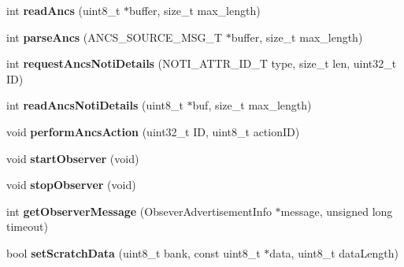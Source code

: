 \begin{DoxyCompactItemize}
\item 
\hypertarget{class_bean_class_af5b1a7b7c109a541f916d4b48a5470af}{}int {\bfseries read\+Ancs} (uint8\+\_\+t $\ast$buffer, size\+\_\+t max\+\_\+length)\label{class_bean_class_af5b1a7b7c109a541f916d4b48a5470af}

\item 
\hypertarget{class_bean_class_a9621a98175bbc20038614a2f302e64bb}{}int {\bfseries parse\+Ancs} (A\+N\+C\+S\+\_\+\+S\+O\+U\+R\+C\+E\+\_\+\+M\+S\+G\+\_\+\+T $\ast$buffer, size\+\_\+t max\+\_\+length)\label{class_bean_class_a9621a98175bbc20038614a2f302e64bb}

\item 
\hypertarget{class_bean_class_aea0173fbc9c1b67be8b945bcf67f5fd8}{}int {\bfseries request\+Ancs\+Noti\+Details} (N\+O\+T\+I\+\_\+\+A\+T\+T\+R\+\_\+\+I\+D\+\_\+\+T type, size\+\_\+t len, uint32\+\_\+t I\+D)\label{class_bean_class_aea0173fbc9c1b67be8b945bcf67f5fd8}

\item 
\hypertarget{class_bean_class_a45afe8462a0b407631befad67f225d2a}{}int {\bfseries read\+Ancs\+Noti\+Details} (uint8\+\_\+t $\ast$buf, size\+\_\+t max\+\_\+length)\label{class_bean_class_a45afe8462a0b407631befad67f225d2a}

\item 
\hypertarget{class_bean_class_aa8a07b292f6bb7bf7e94079641a1d17f}{}void {\bfseries perform\+Ancs\+Action} (uint32\+\_\+t I\+D, uint8\+\_\+t action\+I\+D)\label{class_bean_class_aa8a07b292f6bb7bf7e94079641a1d17f}

\item 
\hypertarget{class_bean_class_aba9f90cf9a063396b5edd526f72db53b}{}void {\bfseries start\+Observer} (void)\label{class_bean_class_aba9f90cf9a063396b5edd526f72db53b}

\item 
\hypertarget{class_bean_class_a8e71e9a5846b51e4ce3829ce5a2121ef}{}void {\bfseries stop\+Observer} (void)\label{class_bean_class_a8e71e9a5846b51e4ce3829ce5a2121ef}

\item 
\hypertarget{class_bean_class_a4d5307962a778b8cd8b792b196c5f908}{}int {\bfseries get\+Observer\+Message} (Obsever\+Advertisement\+Info $\ast$message, unsigned long timeout)\label{class_bean_class_a4d5307962a778b8cd8b792b196c5f908}

\item 
\hypertarget{class_bean_class_a6a8c9b33ada6cc7da1d9229dd0d7849e}{}bool {\bfseries set\+Scratch\+Data} (uint8\+\_\+t bank, const uint8\+\_\+t $\ast$data, uint8\+\_\+t data\+Length)\label{class_bean_class_a6a8c9b33ada6cc7da1d9229dd0d7849e}


\end{DoxyCompactItemize}
